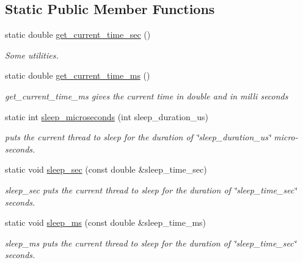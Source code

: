 \subsection*{Static Public Member Functions}
\begin{DoxyCompactItemize}
\item 
static double \hyperlink{classreal__time__tools_1_1Timer_aa1e7794aa57dfba12f7cc30c852ea08c}{get\+\_\+current\+\_\+time\+\_\+sec} ()
\begin{DoxyCompactList}\small\item\em Some utilities. \end{DoxyCompactList}\item 
static double \hyperlink{classreal__time__tools_1_1Timer_aa89f45d2228eb343418c71afb5eaf9b5}{get\+\_\+current\+\_\+time\+\_\+ms} ()
\begin{DoxyCompactList}\small\item\em get\+\_\+current\+\_\+time\+\_\+ms gives the current time in double and in milli seconds \end{DoxyCompactList}\item 
static int \hyperlink{classreal__time__tools_1_1Timer_a705486df1486d737ac30a04ecf7e2b97}{sleep\+\_\+microseconds} (int sleep\+\_\+duration\+\_\+us)
\begin{DoxyCompactList}\small\item\em puts the current thread to sleep for the duration of \char`\"{}sleep\+\_\+duration\+\_\+us\char`\"{} micro-\/seconds. \end{DoxyCompactList}\item 
static void \hyperlink{classreal__time__tools_1_1Timer_a0a0df8a3baef34e820203e5579afda38}{sleep\+\_\+sec} (const double \&sleep\+\_\+time\+\_\+sec)
\begin{DoxyCompactList}\small\item\em sleep\+\_\+sec puts the current thread to sleep for the duration of \char`\"{}sleep\+\_\+time\+\_\+sec\char`\"{} seconds. \end{DoxyCompactList}\item 
static void \hyperlink{classreal__time__tools_1_1Timer_abb2ce808994282d63846e7fca544f818}{sleep\+\_\+ms} (const double \&sleep\+\_\+time\+\_\+ms)
\begin{DoxyCompactList}\small\item\em sleep\+\_\+ms puts the current thread to sleep for the duration of \char`\"{}sleep\+\_\+time\+\_\+sec\char`\"{} seconds. \end{DoxyCompactList}\item 

\end{DoxyCompactItemize}
